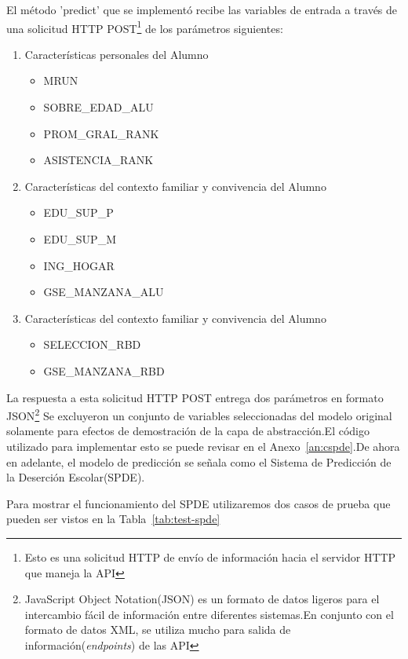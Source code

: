 El método 'predict' que se implementó recibe las variables de entrada a través de una solicitud HTTP POST\footnote{Esto es una solicitud HTTP de envío de información hacia el servidor HTTP que maneja la API} de los parámetros siguientes:
\begin{enumerate}
\item Características personales del Alumno
    \begin{itemize}
    \item MRUN
    \item SOBRE_EDAD_ALU
    \item PROM_GRAL_RANK
    \item ASISTENCIA_RANK
    \end{itemize}
\item Características del contexto familiar y convivencia del Alumno
    \begin{itemize}
    \item EDU_SUP_P
    \item EDU_SUP_M
    \item ING_HOGAR
    \item GSE_MANZANA_ALU
    \end{itemize}
\item Características del contexto familiar y convivencia del Alumno
    \begin{itemize}
    \item SELECCION_RBD
    \item GSE_MANZANA_RBD
    \end{itemize}
\end{enumerate}
La respuesta a esta solicitud HTTP POST entrega dos parámetros en formato JSON\footnote{JavaScript Object Notation(JSON) es un formato de datos ligeros para el intercambio fácil de información entre diferentes sistemas.En conjunto con el formato de datos XML, se utiliza mucho para salida de información(\textit{endpoints}) de las API}
Se excluyeron un conjunto de variables seleccionadas del modelo original solamente para efectos de demostración de la capa de abstracción.El código utilizado para implementar esto se puede revisar en el Anexo~\ref{an:cspde}.De ahora en adelante, el modelo de predicción se señala como el Sistema de Predicción de la Deserción Escolar(SPDE).

Para mostrar el funcionamiento del SPDE utilizaremos dos casos de prueba que pueden ser vistos en la Tabla~\ref{tab:test-spde}
